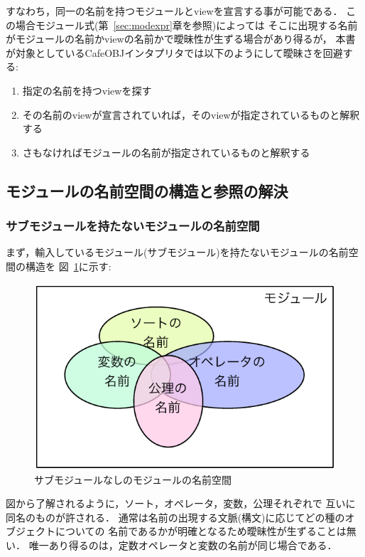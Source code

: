 \documentclass[a4paper,oneside,10pt]{memoir}
\begin{document}
すなわち，同一の名前を持つモジュールとviewを宣言する事が可能である．
この場合モジュール式(第~\ref{sec:modexpr}章を参照)によっては
そこに出現する名前がモジュールの名前かviewの名前かで曖昧性が生ずる場合があり得るが，
本書が対象としているCafeOBJインタプリタでは以下のようにして曖昧さを回避する:
\begin{enumerate}
\item 指定の名前を持つviewを探す
\item その名前のviewが宣言されていれば，そのviewが指定されているものと解釈する
\item さもなければモジュールの名前が指定されているものと解釈する
\end{enumerate}

\subsection{モジュールの名前空間の構造と参照の解決}
\label{sec:inner-module-namaspece}

\subsubsection{サブモジュールを持たないモジュールの名前空間}
\label{sec:flat-module}

まず，輸入しているモジュール(サブモジュール)を持たないモジュールの名前空間の構造を%
図~\ref{fig:flat-module-namespece}に示す:
\begin{figure}[H]
\begin{center}
  \includegraphics[scale=0.7]{flat-module.pdf}
\caption{サブモジュールなしのモジュールの名前空間}
\label{fig:flat-module-namespece}
\end{center}
\end{figure}
図から了解されるように，ソート，オペレータ，変数，公理それぞれで%
互いに同名のものが許される．
通常は名前の出現する文脈(構文)に応じてどの種のオブジェクトについての%
名前であるかが明確となるため曖昧性が生ずることは無い．
唯一あり得るのは，定数オペレータと変数の名前が同じ場合である．
\end{document}
